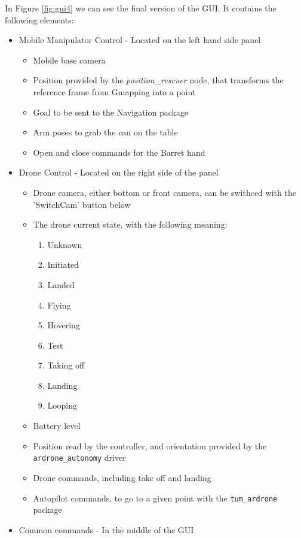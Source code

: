\documentclass[11pt,a4paper]{article}
\begin{document}
In Figure \ref{fig:gui4} we can see the final version of the GUI. It contains the following elements:
\begin{itemize}
	\item Mobile Manipulator Control - Located on the left hand side panel
	\begin{itemize}
		\item Mobile base camera
		\item Position provided by the \textit{position\_rescuer} node, that transforms the reference frame from Gmapping into a point
		\item Goal to be sent to the Navigation package
		\item Arm poses to grab the can on the table
		\item Open and close commands for the Barret hand				
	\end{itemize}	
	\item Drone Control - Located on the right side of the panel
	\begin{itemize}		
		\item Drone camera, either bottom or front camera, can be swithced with the 'SwitchCam' button below
		\item The drone current state, with the following meaning:
		\begin{multicols}{2}
		\begin{enumerate}
			\item Unknown
			\item Initiated
			\item Landed
			\item Flying
			\item Hovering
			\item Test
			\item Taking off
			\item Landing
			\item Looping 
		\end{enumerate}
		\end{multicols}		
		\item Battery level
		\item Position read by the controller, and orientation provided by the \verb!ardrone_autonomy! 	
			driver
		\item Drone commands, including take off and landing
		\item Autopilot commands, to go to a given point with the \verb!tum_ardrone! package	
	\end{itemize}	
	\item Common commands - In the  middle of the GUI

\end{itemize}
\end{document}
